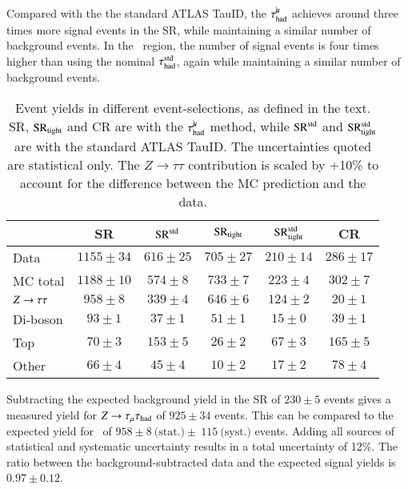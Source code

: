     Compared with the  the standard ATLAS TauID, the $\tau_\mathrm{had}^{\mu\mkern-10mu\backslash}$ achieves around 
    three times more signal events in the SR, while maintaining a similar number of background events. 
    In the \SRtight\ region, the number of signal events 
    is four times higher than using the nominal $\tau_{\text{had}}^\mathrm{std}$, again while maintaining a similar number of background events.
    \begin{table}[htbp]
        \caption{
            Event yields in different event-selections, as defined in the text. 
            SR, $\mathrm{SR}_\mathrm{tight}$ and CR are with the $\tau_\mathrm{had}^{\mu\mkern-10mu\backslash}$ method, while $\mathrm{SR}^\mathrm{std}$ and $\mathrm{SR}_\mathrm{tight}^\mathrm{std}$ are with the standard ATLAS TauID.
            The uncertainties quoted are statistical only. The $Z\rightarrow\tau\tau$ contribution
            is scaled by +10\% to account for the difference between the MC prediction and the data.
        }
        \label{tab:murm:n_evt}
        \centering
        \scriptsize
        \begin{tabular}{l|cc|cc|c}
            \toprule
                                    & SR                & $\mathrm{SR}^\mathrm{std}$                  & $\mathrm{SR}_\mathrm{tight}$                & $\mathrm{SR}_\mathrm{tight}^\mathrm{std}$                         & CR   \\
            \midrule
            Data                    & $1155 \pm 34$     & $616 \pm 25$              & $705 \pm 27$              & $210 \pm 14$                          & $286 \pm 17$     \\ 
            MC total                & $1188 \pm 10$     & $574 \pm 8$               & $733 \pm 7$               & $223 \pm 4$                           & $302 \pm 7$ \\
            \midrule
            $Z \rightarrow \tau\tau$              & $958\pm 8$        & $339 \pm 4$               & $646 \pm 6$               & $124 \pm 2$                           & $20 \pm 1$ \\
            Di-boson                & $93 \pm 1$        & $37 \pm 1$                & $51 \pm 1$                & $15 \pm 0$                            & $39 \pm 1$ \\
            Top                     & $70 \pm 3$        & $153 \pm 5$               & $26 \pm 2$                & $67 \pm 3$                            & $165 \pm 5$  \\
            Other                   & $66 \pm 4$        & $45 \pm 4$                & $10\pm 2$                 & $17 \pm 2$                            & $78 \pm 4$ \\
            \bottomrule
        \end{tabular}
    \end{table}
    Subtracting the expected background yield in the SR of $230\pm 5$ events gives a 
    measured yield for $Z\rightarrow\tau_\mathrm{\mu}\tau_{\text{had}}$ of $925 \pm 34$ events. 
    This can be compared to the expected yield for \Zttmuhad\ of $958 \pm 8~\text{(stat.)}\pm~115~\text{(syst.)}$ events. 
    Adding all sources of statistical and systematic uncertainty results in a total uncertainty of 12\%. 
    The ratio between the background-subtracted data and the expected signal yields is $0.97 \pm 0.12$. 


